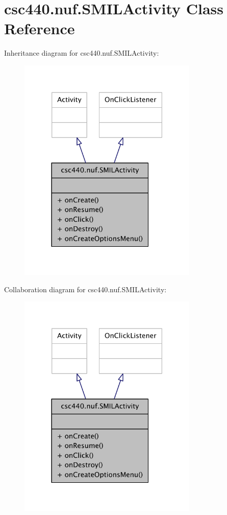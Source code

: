 \hypertarget{classcsc440_1_1nuf_1_1_s_m_i_l_activity}{\section{csc440.\-nuf.\-S\-M\-I\-L\-Activity Class Reference}
\label{classcsc440_1_1nuf_1_1_s_m_i_l_activity}
}


Inheritance diagram for csc440.\-nuf.\-S\-M\-I\-L\-Activity\-:
\nopagebreak
\begin{figure}[H]
\begin{center}
\leavevmode
\includegraphics[width=242pt]{classcsc440_1_1nuf_1_1_s_m_i_l_activity__inherit__graph}
\end{center}
\end{figure}


Collaboration diagram for csc440.\-nuf.\-S\-M\-I\-L\-Activity\-:
\nopagebreak
\begin{figure}[H]
\begin{center}
\leavevmode
\includegraphics[width=242pt]{classcsc440_1_1nuf_1_1_s_m_i_l_activity__coll__graph}
\end{center}
\end{figure}
